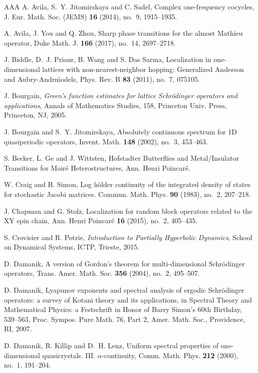 \documentclass[11pt]{amsart}
\theoremstyle{remark}
\theoremstyle{definition}
\begin{document}
\begin{thebibliography}{AAA}
A. Avila, S.~Y. Jitomirskaya and C. Sadel, Complex one-frequency cocycles, J. Eur. Math. Soc. (JEMS) {\bf 16} (2014), no.~9, 1915--1935.

A. Avila, J. You and Q. Zhou, Sharp phase transitions for the almost Mathieu operator, Duke Math. J. {\bf 166} (2017), no.~14, 2697--2718.

J. Biddle, D.~J. Priour, B. Wang and S. Das Sarma, Localization in one-dimensional lattices with non-nearest-neighbor hopping: Generalized Anderson and Aubry-Andr\' models, Phys. Rev. B {\bf 83} (2011), no.~7, 075105.

 J. Bourgain, {\it Green's function estimates for lattice Schr\"odinger operators and applications}, Annals of Mathematics Studies, 158, Princeton Univ. Press, Princeton, NJ, 2005.

J. Bourgain and S.~Y. Jitomirskaya, Absolutely continuous spectrum for 1D quasiperiodic operators, Invent. Math. {\bf 148} (2002), no.~3, 453--463.


S. Becker, L. Ge and J. Wittsten, Hofstadter Butterflies and Metal/Insulator Transitions for Moir{\'e} Heterostructures, Ann. Henri Poincar{\'e}. 

W. Craig and B. Simon, Log h\"older continuity of the integrated density of states for stochastic Jacobi matrices. Commun. Math. Phys. {\bf 90} (1983), no.~2, 207–218.


J. Chapman and G. Stolz, Localization for random block operators related to the XY spin chain, Ann. Henri Poincar\'e{} {\bf 16} (2015), no.~2, 405--435.


 S. Crovisier and  R. Potrie, {\it Introduction to Partially Hyperbolic Dynamics}, School on Dynamical Systems, ICTP, Trieste, 2015.

D. Damanik, A version of Gordon's theorem for multi-dimensional Schr\"odinger operators, Trans. Amer. Math. Soc. {\bf 356} (2004), no.~2, 495--507.

D. Damanik, Lyapunov exponents and spectral analysis of ergodic Schr\"odinger operators: a survey of Kotani theory and its applications, in Spectral Theory and Mathematical Physics: a Festschrift in Honor of Barry Simon’s 60th Birthday, 539–563, Proc. Sympos. Pure Math. 76, Part 2, Amer. Math. Soc., Providence, RI, 2007.

D. Damanik, R. Killip and D.~H. Lenz, Uniform spectral properties of one-dimensional quasicrystals. III. $\alpha$-continuity, Comm. Math. Phys. {\bf 212} (2000), no.~1, 191--204.


\end{thebibliography}
\end{document}

